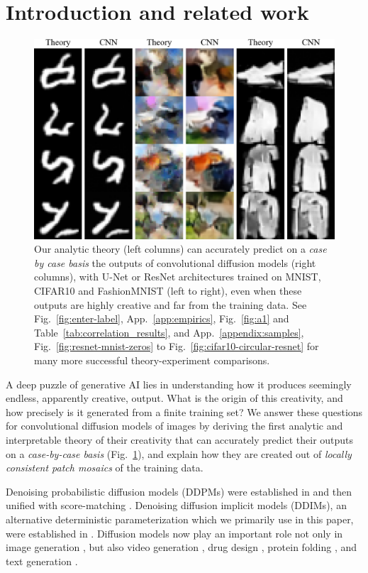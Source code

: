 \documentclass{article}
\theoremstyle{plain}
\theoremstyle{definition}
\theoremstyle{remark}
\begin{document}
\section{Introduction and related work}
\begin{figure}[t]
    \centering
    \includegraphics[width=\linewidth]{figure1a_m.png}
    \caption{Our analytic theory (left columns) can accurately predict on a {\it case by case basis} the outputs of convolutional diffusion models (right columns),  with U-Net or ResNet architectures trained on MNIST, CIFAR10 and FashionMNIST (left to right), even when these outputs are highly creative and far from the training data. See Fig.~\ref{fig:enter-label}, App.~\ref{app:empirics}, Fig.~\ref{fig:a1} and Table~\ref{tab:correlation_results}, and App.~\ref{appendix:samples}, Fig.~\ref{fig:resnet-mnist-zeros} to Fig.~\ref{fig:cifar10-circular-resnet} for many more successful theory-experiment comparisons.}
    \label{fig:figure1}
\end{figure}

A deep puzzle of generative AI lies in understanding how it produces seemingly endless, apparently creative, output.  What is the origin of this creativity, and how precisely is it generated from a finite training set? We answer these questions for convolutional diffusion models of images by deriving the first analytic and interpretable theory of their creativity that can accurately predict their outputs on a {\it case-by-case basis} (Fig.~\ref{fig:figure1}), and explain how they are created out of {\it locally consistent patch mosaics} of the training data. 

Denoising probabilistic diffusion models (DDPMs) were established in  \cite{sohl2015deep,ho2020denoising} and then unified with score-matching \cite{song2019generative,song2020score}. Denoising diffusion implicit models (DDIMs), an alternative deterministic parameterization which we primarily use in this paper, were established in \cite{song2020denoising}.  Diffusion models now play an important role not only in image generation 
\cite{dhariwal2021diffusion,rombach2022high, ramesh2022hierarchical}, but also video generation \cite{ho2022imagen, ho2022video, blattmann2023stable}, drug design \cite{alakhdar2024diffusion}, protein folding \cite{watson2023novo}, and text generation \cite{li2023diffusion, li2022diffusion}.
\end{document}
